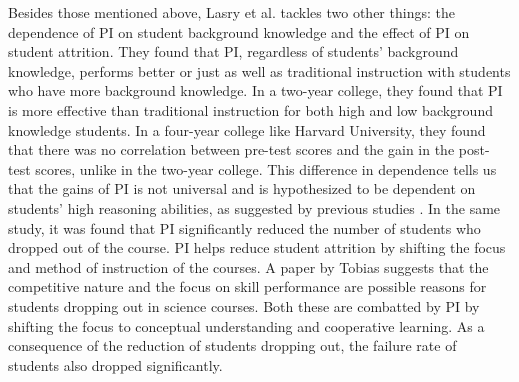 Besides those mentioned above, Lasry et al. \cite{lasry2008peer} tackles two other things: the dependence of PI on student background knowledge and the effect of PI on student attrition.
They found that PI, regardless of students' background knowledge, performs better or just as well as traditional instruction with students who have more background knowledge.
In a two-year college, they found that PI is more effective than traditional instruction for both high and low background knowledge students.
In a four-year college like Harvard University, they found that there was no correlation between pre-test scores and the gain in the post-test scores, unlike in the two-year college.
This difference in dependence tells us that the gains of PI is not universal and is hypothesized to be dependent on students' high reasoning abilities, as suggested by previous studies \cite{coletta2005interpreting}.
In the same study, it was found that PI significantly reduced the number of students who dropped out of the course.
PI helps reduce student attrition by shifting the focus and method of instruction of the courses.
A paper by Tobias \cite{tobias1990they} suggests that the competitive nature and the focus on skill performance are possible reasons for students dropping out in science courses.
Both these are combatted by PI by shifting the focus to conceptual understanding and cooperative learning.
As a consequence of the reduction of students dropping out, the failure rate of students also dropped significantly.




